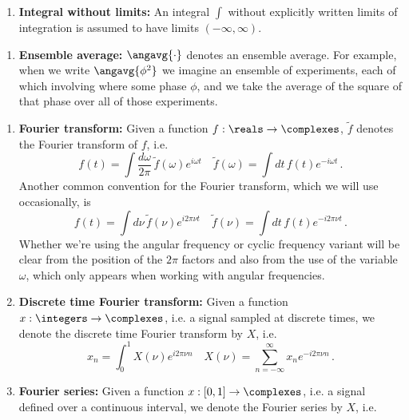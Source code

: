 \begin{enumerate}
  \item \textbf{Integral without limits:} An integral $\int$ without explicitly written limits of integration is assumed to have limits $(-\infty, \infty)$.
\end{enumerate}

\begin{enumerate}
  \item \textbf{Ensemble average:} $\angavg{\cdot}$ denotes an ensemble average. For example, when we write $\angavg{\phi^2}$ we imagine an ensemble of experiments, each of which involving where some phase $\phi$, and we take the average of the square of that phase over all of those experiments.
\end{enumerate}


\begin{enumerate}
  \item \textbf{Fourier transform:} Given a function $f: \reals \rightarrow \complexes$, $\tilde f$ denotes the Fourier transform of $f$, i.e.
  \begin{displaymath}
    f(t) = \int \frac{d \omega}{2\pi} \, \tilde f (\omega) e^{i \omega t}
    \quad \tilde f(\omega) = \int dt \, f(t) e^{-i \omega t}
    \, .
  \end{displaymath}
  Another common convention for the Fourier transform, which we will use occasionally, is
  \begin{displaymath}
    f(t) = \int d\nu \, \tilde f (\nu) e^{i 2 \pi \nu t}
    \quad \tilde f(\nu) = \int dt \, f(t) e^{-i 2 \pi \nu t}
    \, .
  \end{displaymath}
  Whether we're using the angular frequency or cyclic frequency variant will be clear from the position of the $2\pi$ factors and also from the use of the variable $\omega$, which only appears when working with angular frequencies.
  \item \textbf{Discrete time Fourier transform:} Given a function $x: \integers \rightarrow \complexes$, i.e. a signal sampled at discrete times, we denote the discrete time Fourier transform by $X$, i.e.
    \begin{displaymath}
      x_n = \int_0^1 X(\nu) e^{i 2\pi \nu n}
      \quad
      X(\nu) = \sum_{n=-\infty}^\infty x_n e^{-i 2 \pi \nu n}
      \, .
    \end{displaymath}
  \item \textbf{Fourier series:} Given a function $x: [0, 1] \rightarrow \complexes$, i.e. a signal defined over a continuous interval, we denote the Fourier series by $X$, i.e.
\end{enumerate}
